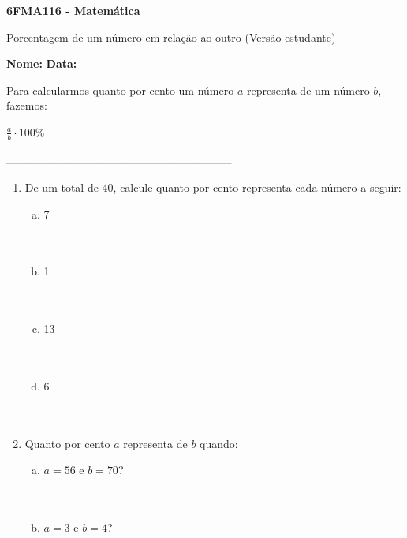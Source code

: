 \documentclass[a4paper,14pt]{article}
\begin{document}
	
	\noindent\textbf{6FMA116 - Matemática} 
	
	\begin{center}Porcentagem de um número em relação ao outro (Versão estudante)
	\end{center}
	
	\noindent\textbf{Nome:} \underline{\hspace{10cm}}
	\noindent\textbf{Data:} \underline{\hspace{4cm}}
	
	
	\begin{multicols}{2}
		\noindent Para calcularmos quanto por cento um número $a$ representa de um número $b$, fazemos:
		\begin{center}
		$\frac{a}{b} \cdot 100\%$ \\
		\end{center}
		\noindent\textsubscript{--------------------------------------------------------------------------}
		\begin{enumerate} 
			\item De um total de 40, calcule quanto por cento representa cada número a seguir:
			\begin{enumerate}[a)]
				\item 7 \\\\\\
				\item 1 \\\\\\
				\item 13 \\\\\\
				\item 6 \\\\\\
			\end{enumerate}
			\item Quanto por cento $a$ representa de $b$ quando:
			\begin{enumerate}[a)]
				\item $a = 56$ e $b = 70$? \\\\\\
				\item $a = 3$ e $b = 4$?

\end{enumerate}
\end{enumerate}
\end{multicols}
\end{document}
